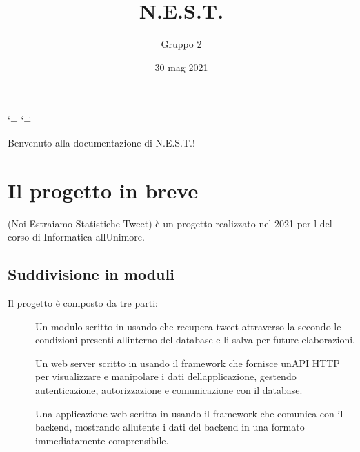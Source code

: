 \documentclass[letterpaper,10pt,italian]{sphinxmanual}
\title{N.E.S.T.\@{}}
\date{30 mag 2021}
\author{Gruppo 2}
\begin{document}
\ifdefined\shorthandoff
  \ifnum\catcode`\=\string=\active\shorthandoff{=}\fi
  \ifnum\catcode`\"=\active{}\fi
\fi

\pagestyle{empty}
\sphinxmaketitle
\pagestyle{plain}
\sphinxtableofcontents
\pagestyle{normal}
\label{\detokenize{index::doc}}


\sphinxAtStartPar
Benvenuto alla documentazione di N.E.S.T.!


\chapter{Il progetto in breve}
\label{\detokenize{guide/about:il-progetto-in-breve}}\label{\detokenize{guide/about::doc}}
\sphinxAtStartPar
{} (Noi Estraiamo Statistiche Tweet) è un progetto realizzato nel 2021 per
l\textquotesingle{} del corso di Informatica all\textquotesingle{}Unimore.


\section{Suddivisione in moduli}
\label{\detokenize{guide/about:suddivisione-in-moduli}}
\sphinxAtStartPar
Il progetto è composto da tre parti:
\begin{description}
\item[{{\hyperref[\detokenize{code/crawler/index:module-nest_crawler}]{}}}] \leavevmode
\sphinxAtStartPar
Un modulo scritto in  usando  che recupera tweet attraverso la  secondo le
condizioni presenti all\textquotesingle{}interno del database e li salva per future elaborazioni.

\item[{{\hyperref[\detokenize{code/backend/index:module-nest_backend}]{}}}] \leavevmode
\sphinxAtStartPar
Un web server scritto in  usando il framework  che fornisce un\textquotesingle{}API HTTP per visualizzare e
manipolare i dati dell\textquotesingle{}applicazione, gestendo autenticazione, autorizzazione e comunicazione con il database.

\item[{}] \leavevmode
\sphinxAtStartPar
Una applicazione web scritta in  usando il framework  che comunica con il backend, mostrando
all\textquotesingle{}utente i dati del backend in una formato immediatamente comprensibile.

\end{description}
\end{document}

